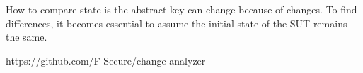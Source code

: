 How to compare state is the abstract key can change because of changes. To find differences, it becomes essential to assume the initial state of the SUT remains the same. 

https://github.com/F-Secure/change-analyzer
